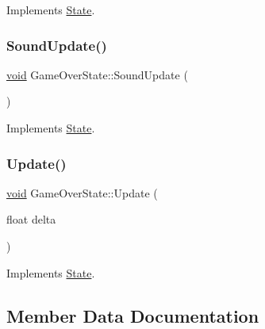 Implements \hyperlink{classState_a0e48dfae1e3090630475812681417c5f}{State}.

\mbox{\label{classGameOverState_ab46f47037abd1eeabdbff49f8dfb802b}} 
\subsubsection{\texorpdfstring{Sound\+Update()}{SoundUpdate()}}
{\footnotesize\ttfamily \hyperlink{imgui__impl__opengl3__loader_8h_ac668e7cffd9e2e9cfee428b9b2f34fa7}{void} Game\+Over\+State\+::\+Sound\+Update (\begin{DoxyParamCaption}{ }\end{DoxyParamCaption})\hspace{0.3cm}{\ttfamily [virtual]}}



Implements \hyperlink{classState_a6572089fbf2178bf5c582cc27d6d3925}{State}.

\mbox{\label{classGameOverState_a4dc49d576a9435531f502660119800a9}} 
\subsubsection{\texorpdfstring{Update()}{Update()}}
{\footnotesize\ttfamily \hyperlink{imgui__impl__opengl3__loader_8h_ac668e7cffd9e2e9cfee428b9b2f34fa7}{void} Game\+Over\+State\+::\+Update (\begin{DoxyParamCaption}\item[{float}]{delta }\end{DoxyParamCaption})\hspace{0.3cm}{\ttfamily [virtual]}}



Implements \hyperlink{classState_aac0d3fdee1341e168af730b8f31a7bf1}{State}.



\subsection{Member Data Documentation}
\mbox{\label{classGameOverState_a1df24a620531ad2a7ebfca275725c2ea}} 
